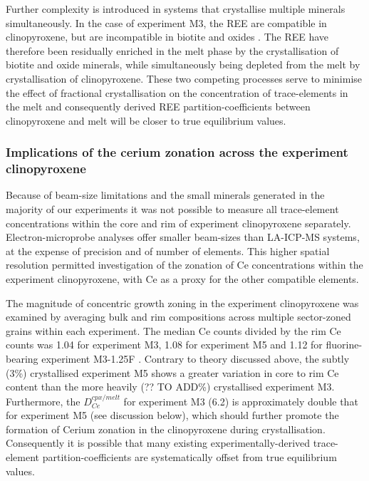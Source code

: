 \documentclass[review,authoryear,12pt]{elsarticle}
\begin{document}
    Further complexity is introduced in systems that crystallise multiple minerals simultaneously. In the case of experiment M3, the REE are compatible in clinopyroxene, but are incompatible in biotite and oxides \citep[e.g.][]{Mahood1990,Schmidt1999}. The REE have therefore been residually enriched in the melt phase by the crystallisation of biotite and oxide minerals, while simultaneously being depleted from the melt by crystallisation of clinopyroxene. These two competing processes serve to minimise the effect of fractional crystallisation on the concentration of trace-elements in the melt and consequently derived REE partition-coefficients between clinopyroxene and melt will be closer to true equilibrium values.

\subsubsection{Implications of the cerium zonation across the experiment clinopyroxene}
Because of beam-size limitations and the small minerals generated in the majority of our experiments it was not possible to measure all trace-element concentrations within the core and rim of experiment clinopyroxene separately.
    Electron-microprobe analyses offer smaller beam-sizes than LA-ICP-MS systems, at the expense of precision and of number of elements. This higher spatial resolution permitted investigation of the zonation of Ce concentrations within the experiment clinopyroxene, with Ce as a proxy for the other compatible elements.


The magnitude of concentric growth zoning in the experiment clinopyroxene was examined by averaging bulk and rim compositions across multiple sector-zoned grains within each experiment. The median Ce counts divided by the rim Ce counts was 1.04 for experiment M3, 1.08 for experiment M5 and 1.12 for fluorine-bearing experiment M3-1.25F \citep[see][]{Beard_PhD_Thesis}. Contrary to theory discussed above, the subtly (3\%) crystallised experiment M5 shows a greater variation in core to rim Ce content than the more heavily (?? TO ADD\%) crystallised experiment M3. Furthermore, the $D_{Ce}^{cpx/melt}$ for experiment M3 (6.2) is approximately double that for experiment M5 (see discussion below), which should further promote the formation of Cerium zonation in the clinopyroxene during crystallisation. Consequently it is possible that many existing experimentally-derived trace-element partition-coefficients are systematically offset from true equilibrium values.
\end{document}
